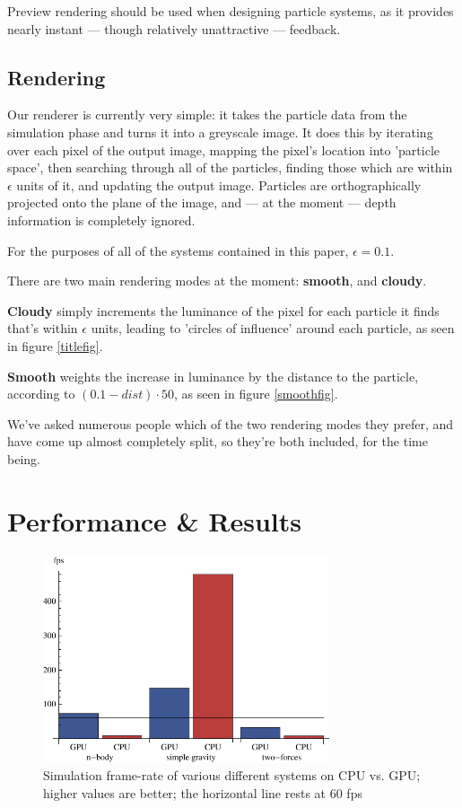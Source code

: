 \documentclass{acmsiggraph}
\begin{document}
Preview rendering should be used when designing particle systems, as it provides nearly instant --- though relatively unattractive --- feedback.

\subsection{Rendering}

Our renderer is currently very simple: it takes the particle data from the simulation phase and turns it into a greyscale image. It does this by iterating over each pixel of the output image, mapping the pixel's location into 'particle space', then searching through all of the particles, finding those which are within $\epsilon$ units of it, and updating the output image. Particles are orthographically projected onto the plane of the image, and --- at the moment --- depth information is completely ignored.

For the purposes of all of the systems contained in this paper, $\epsilon=0.1$.

There are two main rendering modes at the moment: {\bf smooth}, and {\bf cloudy}.

{\bf Cloudy} simply increments the luminance of the pixel for each particle it finds that's within $\epsilon$ units, leading to 'circles of influence' around each particle, as seen in figure \ref{titlefig}.

{\bf Smooth} weights the increase in luminance by the distance to the particle, according to $(0.1 - dist) \cdot 50$, as seen in figure \ref{smoothfig}.

We've asked numerous people which of the two rendering modes they prefer, and have come up almost completely split, so they're both included, for the time being.

\section{Performance \& Results}

\label{performanceSection}

\begin{figure}
    \includegraphics[width=84.5mm]{basicSpeedPlot.pdf}
    \caption{Simulation frame-rate of various different systems on CPU vs. GPU; higher values are better; the horizontal line rests at 60 fps}
    \label{fig:basicSpeedPlot}
\end{figure}
\end{document}
